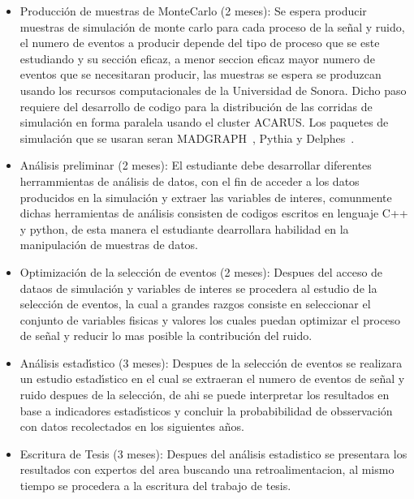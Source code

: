 \begin{itemize}
  
\item Producci\'on de muestras de MonteCarlo (2 meses): Se espera producir muestras de simulaci\'on de monte carlo para cada proceso de la se\~nal y ruido, el numero de eventos a producir depende del tipo de proceso que se este estudiando y su secci\'on eficaz, a menor seccion eficaz mayor numero de eventos que se necesitaran producir, las muestras se espera se produzcan usando los recursos computacionales de la Universidad de Sonora. Dicho paso requiere del desarrollo de codigo para la distribuci\'on de las corridas de simulaci\'on en forma paralela usando el cluster ACARUS. Los paquetes de simulaci\'on que se usaran seran MADGRAPH~\cite{Alwall:2007st}, Pythia y Delphes~\cite{deFavereau2014}.

\item An\'alisis preliminar (2 meses): El estudiante debe desarrollar diferentes herrammientas de an\'alisis de datos, con el fin de acceder a los datos producidos en la simulaci\'on y extraer las variables de interes, comunmente dichas herramientas de an\'alisis consisten de codigos escritos en lenguaje C++ y python, de esta manera el estudiante dearrollara habilidad en la manipulaci\'on de muestras de datos. 

\item Optimizaci\'on de la selecci\'on de eventos (2 meses): Despues del acceso de dataos de simulaci\'on y variables de interes se procedera al estudio de la selecci\'on de eventos, la cual a grandes razgos consiste en seleccionar el conjunto de variables fisicas y valores los cuales puedan optimizar el proceso de se\~nal y reducir lo mas posible la contribuci\'on del ruido. 

\item An\'alisis estad\'{\i}stico (3 meses): Despues de la selecci\'on de eventos se realizara un estudio estad\'{\i}stico en el cual se extraeran el numero de eventos de se\~nal y ruido despues de la selecci\'on, de ahi se puede interpretar los resultados en base a indicadores estad\'{\i}sticos y concluir la probabibilidad de obsservaci\'on con datos recolectados en los siguientes a\~nos.

\item Escritura de Tesis (3 meses): Despues del an\'alisis estadistico se presentara los resultados con expertos del area buscando una retroalimentacion, al mismo tiempo se procedera a la escritura del trabajo de tesis. 

\end{itemize}
  
